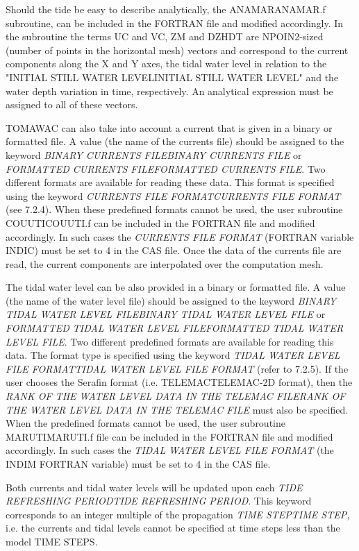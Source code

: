  Should the tide be easy to describe analytically, the ANAMARANAMAR.f subroutine, can be included in the FORTRAN file and modified accordingly. In the subroutine the terms UC and VC, ZM and DZHDT are NPOIN2-sized (number of points in the horizontal mesh) vectors and correspond to the current components along the X and Y axes, the tidal water level in relation to the "INITIAL STILL WATER LEVELINITIAL STILL WATER LEVEL" and the water depth variation in time, respectively. An analytical expression must be assigned to all of these vectors.

 TOMAWAC can also take into account a current that is given in a binary or formatted file. A value (the name of the currents file) should be assigned to the keyword \textit{BINARY CURRENTS FILEBINARY CURRENTS FILE }or\textit{ FORMATTED CURRENTS FILEFORMATTED CURRENTS FILE}. Two different formats are available for reading these data. This format is specified using the keyword \textit{CURRENTS FILE FORMATCURRENTS FILE FORMAT} (see 7.2.4). When these predefined formats cannot be used, the user subroutine COUUTICOUUTI.f can be included in the FORTRAN file and modified accordingly. In such cases the \textit{CURRENTS FILE FORMAT} (FORTRAN variable INDIC) must be set to 4 in the CAS file. Once the data of the currents file are read, the current components are interpolated over the computation mesh.

 The tidal water level can be also provided in a binary or formatted file. A value (the name of the water level file) should be assigned to the keyword \textit{BINARY TIDAL WATER LEVEL FILEBINARY TIDAL WATER LEVEL FILE }or\textit{ FORMATTED TIDAL WATER LEVEL FILEFORMATTED TIDAL WATER LEVEL FILE}. Two different predefined formats are available for reading this data. The format type is specified using the keyword \textit{TIDAL WATER LEVEL FILE FORMATTIDAL WATER LEVEL FILE FORMAT} (refer to 7.2.5). If the user chooses the Serafin format (i.e. TELEMACTELEMAC-2D format), then the \textit{RANK OF THE WATER LEVEL DATA IN THE TELEMAC FILERANK OF THE WATER LEVEL DATA IN THE TELEMAC FILE} must also be specified. When the predefined formats cannot be used, the user subroutine MARUTIMARUTI.f file can be included in the FORTRAN file and modified accordingly. In such cases the \textit{TIDAL WATER LEVEL FILE FORMAT} (the INDIM FORTRAN variable) must be set to 4 in the CAS file.

 Both currents and tidal water levels will be updated upon each \textit{TIDE REFRESHING PERIODTIDE REFRESHING PERIOD}. This keyword corresponds to an integer multiple of the propagation \textit{TIME STEPTIME STEP, }i.e. the currents and tidal levels cannot be specified at time steps less than the model TIME STEPS\textit{.}


